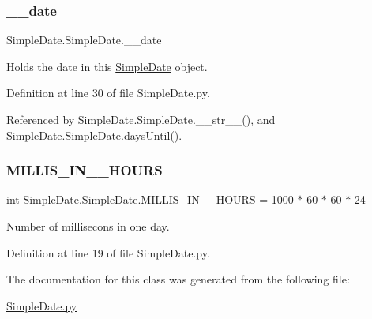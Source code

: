 \subsubsection{\texorpdfstring{\+\_\+\+\_\+date}{\_\_date}}
{\footnotesize\ttfamily Simple\+Date.\+Simple\+Date.\+\_\+\+\_\+date\hspace{0.3cm}{\ttfamily [private]}}



Holds the date in this \hyperlink{classSimpleDate_1_1SimpleDate}{Simple\+Date} object. 



Definition at line 30 of file Simple\+Date.\+py.



Referenced by Simple\+Date.\+Simple\+Date.\+\_\+\+\_\+str\+\_\+\+\_\+(), and Simple\+Date.\+Simple\+Date.\+days\+Until().

\mbox{\label{classSimpleDate_1_1SimpleDate_a0481c6d110c7475177a3e59aa89fb20b}} 
\subsubsection{\texorpdfstring{M\+I\+L\+L\+I\+S\+\_\+\+I\+N\+\_\+\_\+\+H\+O\+U\+RS}{MILLIS\_IN\_24\_HOURS}}
{\footnotesize\ttfamily int Simple\+Date.\+Simple\+Date.\+M\+I\+L\+L\+I\+S\+\_\+\+I\+N\+\_\+\_\+\+H\+O\+U\+RS = 1000 $\ast$ 60 $\ast$ 60 $\ast$ 24\hspace{0.3cm}{\ttfamily [static]}}



Number of millisecons in one day. 



Definition at line 19 of file Simple\+Date.\+py.



The documentation for this class was generated from the following file\+:\begin{DoxyCompactItemize}
\item 
\hyperlink{SimpleDate_8py}{Simple\+Date.\+py}\end{DoxyCompactItemize}
